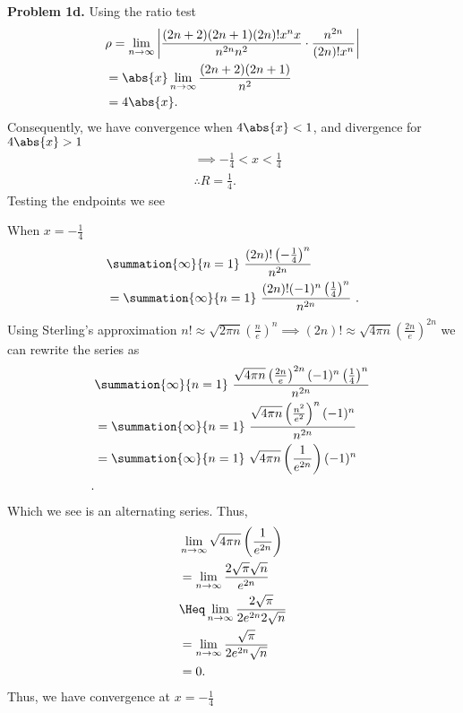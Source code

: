 \documentclass{report}
\begin{document}
    \pagebreak \bigbreak \noindent 
    \textbf{Problem 1d.} Using the ratio test
    \begin{align*}
        &\rho = \lim\limits_{n \to \infty}{\bigg\lvert \frac{(2n+2)(2n+1)(2n)!x^{n}x}{n^{2n}n^{2}} \cdot \frac{n^{2n}}{(2n)!x^{n}} \bigg\rvert} \\
        &=\abs{x}\lim\limits_{n \to \infty}{\frac{(2n+2)(2n+1)}{n^{2}}} \\
        &=4\abs{x} 
    .\end{align*} 
    \bigbreak \noindent 
    Consequently, we have convergence when $4\abs{x} < 1$, and divergence for $4\abs{x} > 1$
    \begin{align*}
        &\implies  -\frac{1}{4} < x < \frac{1}{4} \\
        &\therefore R = \frac{1}{4}
    .\end{align*}
    \bigbreak \noindent 
    Testing the endpoints we see
    \bigbreak \noindent 
    \begin{minipage}[t]{0.47\textwidth}
        When $x=-\frac{1}{4}$ 
        \begin{align*}
            &\summation{\infty}{n=1}\ \frac{(2n)!\left(-\frac{1}{4}\right)^{n}}{n^{2n}}\  \\
            &=\summation{\infty}{n=1}\ \frac{(2n)!(-1)^{n}\left(\frac{1}{4}\right)^{n}}{n^{2n}}\ 
        .\end{align*}
        \bigbreak \noindent 
        Using Sterling's approximation $n! \approx \sqrt{2\pi n}\left(\frac{n}{e}\right)^{n} \implies (2n)! \approx \sqrt{4\pi n}\left(\frac{2n}{e}\right)^{2n}$ we can rewrite the series as
        \begin{align*}
            &\summation{\infty}{n=1}\ \frac{\sqrt{4\pi n}\left(\frac{2n}{e}\right)^{2n}(-1)^{n}\left(\frac{1}{4}\right)^{n}}{n^{2n}}\  \\
        &=\summation{\infty}{n=1}\  \frac{\sqrt{4\pi n} \left(\frac{n^{2}}{e^{2}}\right)^{n}(-1)^{n}}{n^{2n}}\  \\
        &=\summation{\infty}{n=1}\  \sqrt{4\pi n} \left(\frac{1}{e^{2n}}\right)(-1)^{n}\  \\
        .\end{align*}
        Which we see is an alternating series. Thus, 
        \begin{align*}
            &\lim\limits_{n \to \infty}{\sqrt{4\pi n}\left(\frac{1}{e^{2n}}\right)} \\
            &=\lim\limits_{n \to \infty}{\frac{2 \sqrt{\pi} \sqrt{n}}{e^{2n}}} \\
            &\Heq \lim\limits_{n \to \infty}{\frac{2\sqrt{\pi}}{2e^{2n}2\sqrt{n}}} \\
            &=\lim\limits_{n \to\infty }{\frac{\sqrt{\pi}}{2e^{2n}\sqrt{n}}} \\
            &=0
        .\end{align*}
        Thus, we have convergence at $x=-\frac{1}{4} $
    \end{minipage}
\end{document}
